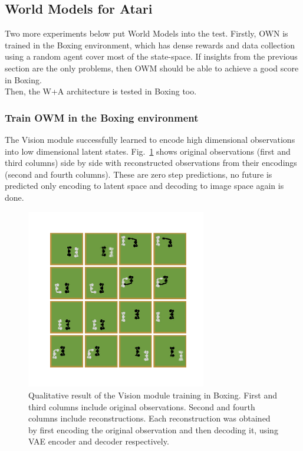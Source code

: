 \subsection{World Models for Atari}

Two more experiments below put World Models into the test. Firstly, OWN is trained in the Boxing environment, which has dense rewards and data collection using a random agent cover most of the state-space. If insights from the previous section are the only problems, then OWM should be able to achieve a good score in Boxing. \\
Then, the W+A architecture is tested in Boxing too.

\subsubsection{Train OWM in the Boxing environment}

The Vision module successfully learned to encode high dimensional observations into low dimensional latent states. Fig.~\ref{Fig.WM_Boxing_vision} shows original observations (first and third columns) side by side with reconstructed observations from their encodings (second and fourth columns). These are zero step predictions, no future is predicted only encoding to latent space and decoding to image space again is done.

\begin{figure}[H]
\includegraphics[width=0.7\textwidth,keepaspectratio]{figures/Boxing_vision.png}
\caption[Qualitative result of the World Models' Vision module training in Boxing]{Qualitative result of the Vision module training in Boxing. First and third columns include original observations. Second and fourth columns include reconstructions. Each reconstruction was obtained by first encoding the original observation and then decoding it, using VAE encoder and decoder respectively.}
\label{Fig.WM_Boxing_vision}
\end{figure}

